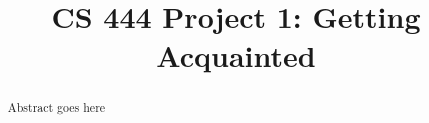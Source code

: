 \documentclass[10pt,letterpaper,draftclsnofoot,onecolumn]{IEEEtran}
\begin{document}

\begin{titlepage}
\title{CS 444 Project 1: Getting Acquainted}
\author
{
}
    \maketitle
    \vspace{2cm}
    \begin{abstract}
        \noindent Abstract goes here
    \end{abstract}

\end{titlepage}
\end{document}
